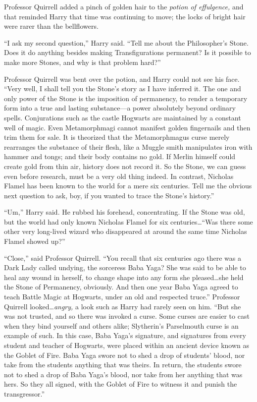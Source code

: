 Professor Quirrell added a pinch of golden hair to the \emph{potion of effulgence,} and that reminded Harry that time was continuing to move; the locks of bright hair were rarer than the bellflowers.

“I ask my second question,” Harry said. “Tell me about the Philosopher’s Stone. Does it do anything besides making Transfigurations permanent? Is it possible to make more Stones, and why is that problem hard?”

Professor Quirrell was bent over the potion, and Harry could not see his face. “Very well, I shall tell you the Stone’s story as I have inferred it. The one and only power of the Stone is the imposition of permanency, to render a temporary form into a true and lasting substance—a power absolutely beyond ordinary spells. Conjurations such as the castle Hogwarts are maintained by a constant well of magic. Even Metamorphmagi cannot manifest golden fingernails and then trim them for sale. It is theorized that the Metamorphmagus curse merely rearranges the substance of their flesh, like a Muggle smith manipulates iron with hammer and tongs; and their body contains no gold. If Merlin himself could create gold from thin air, history does not record it. So the Stone, we can guess even before research, must be a very old thing indeed. In contrast, Nicholas Flamel has been known to the world for a mere six centuries. Tell me the obvious next question to ask, boy, if you wanted to trace the Stone’s history.”

“Um,” Harry said. He rubbed his forehead, concentrating. If the Stone was old, but the world had only known Nicholas Flamel for six centuries…“Was there some other very long-lived wizard who disappeared at around the same time Nicholas Flamel showed up?”

“Close,” said Professor Quirrell. “You recall that six centuries ago there was a Dark Lady called undying, the sorceress Baba Yaga? She was said to be able to heal any wound in herself, to change shape into any form she pleased…she held the Stone of Permanency, obviously. And then one year Baba Yaga agreed to teach Battle Magic at Hogwarts, under an old and respected truce.” Professor Quirrell looked…\emph{angry,} a look such as Harry had rarely seen on him. “But she was not trusted, and so there was invoked a curse. Some curses are easier to cast when they bind yourself and others alike; Slytherin’s Parselmouth curse is an example of such. In this case, Baba Yaga’s signature, and signatures from every student and teacher of Hogwarts, were placed within an ancient device known as the Goblet of Fire. Baba Yaga swore not to shed a drop of students’ blood, nor take from the students anything that was theirs. In return, the students swore not to shed a drop of Baba Yaga’s blood, nor take from her anything that was hers. So they all signed, with the Goblet of Fire to witness it and punish the transgressor.”

